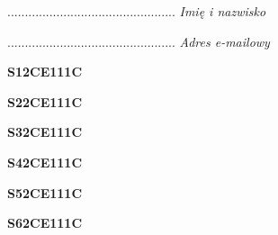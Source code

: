 \begin{turn}{90}\begin{minipage}{\linewidth} \vspace{20mm} ................................................  \textit{Imię i nazwisko}\end{minipage}\end{turn}

\begin{turn}{90}\begin{minipage}{\linewidth} \vspace{20mm} ................................................  \textit{Adres e-mailowy}\end{minipage}\end{turn}

\begin{turn}{90}\huge \begin{minipage}{\linewidth} \vspace{10mm}\textbf{S12CE111C}\end{minipage}\end{turn}

\begin{turn}{90}\huge \begin{minipage}{\linewidth} \vspace{10mm}\textbf{S22CE111C}\end{minipage}\end{turn}

\begin{turn}{90}\huge \begin{minipage}{\linewidth} \vspace{10mm}\textbf{S32CE111C}\end{minipage}\end{turn}

\begin{turn}{90}\huge \begin{minipage}{\linewidth} \vspace{10mm}\textbf{S42CE111C}\end{minipage}\end{turn}

\begin{turn}{90}\huge \begin{minipage}{\linewidth} \vspace{10mm}\textbf{S52CE111C}\end{minipage}\end{turn}

\begin{turn}{90}\huge \begin{minipage}{\linewidth} \vspace{10mm}\textbf{S62CE111C}\end{minipage}\end{turn}

